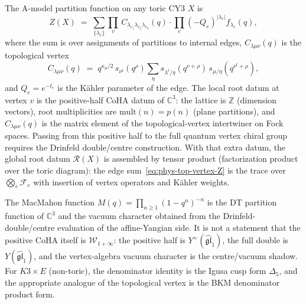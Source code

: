 \begin{construction}
\label{constr:phys-top-vertex-root}
The A-model partition function on any toric CY3 $X$ is
\begin{equation}\label{eq:phys-top-vertex-Z}
Z(X) \;=\; \sum_{\{\lambda_e\}} \prod_{v}\, C_{\lambda_{e_1}\lambda_{e_2}\lambda_{e_3}}(q)
\cdot \prod_{e} (-Q_e)^{|\lambda_e|} f_{\lambda_e}(q),
\end{equation}
where the sum is over assignments of partitions to internal edges, $C_{\lambda\mu\nu}(q)$ is the topological vertex
\begin{equation}\label{eq:phys-c-vertex}
C_{\lambda\mu\nu}(q) \;=\; q^{\kappa_\mu/2}\, s_{\nu^t}(q^\rho)
\sum_\eta s_{\lambda^t/\eta}(q^{\nu+\rho})\, s_{\mu/\eta}(q^{\nu^t+\rho}),
\end{equation}
and $Q_e = e^{-t_e}$ is the K\"{a}hler parameter of the edge. The local root datum at vertex $v$ is the positive-half CoHA datum of $\mathbb{C}^3$: the lattice is $\mathbb{Z}$ (dimension vectors), root multiplicities are $\mathrm{mult}(n)=p(n)$ (plane partitions), and $C_{\lambda\mu\nu}(q)$ is the matrix element of the topological-vertex intertwiner on Fock spaces. Passing from this positive half to the full quantum vertex chiral group requires the Drinfeld double/centre construction. With that extra datum, the global root datum $\mathcal{R}(X)$ is assembled by tensor product (factorization product over the toric diagram): the edge sum~\eqref{eq:phys-top-vertex-Z} is the trace over $\bigotimes_e \mathcal{F}_e$ with insertion of vertex operators and K\"{a}hler weights.
\end{construction}

\begin{remark}
The MacMahon function $M(q) = \prod_{n \geq 1}(1-q^n)^{-n}$ is the DT partition function of $\mathbb{C}^3$ and the vacuum character obtained from the Drinfeld-double/centre evaluation of the affine-Yangian side. It is not a statement that the positive CoHA itself is $\mathcal{W}_{1+\infty}$: the positive half is $Y^+(\widehat{\mathfrak{gl}}_1)$, the full double is $Y(\widehat{\mathfrak{gl}}_1)$, and the vertex-algebra vacuum character is the centre/vacuum shadow. For $K3 \times E$ (non-toric), the denominator identity is the Igusa cusp form $\Delta_5$, and the appropriate analogue of the topological vertex is the BKM denominator product form.
\end{remark}

